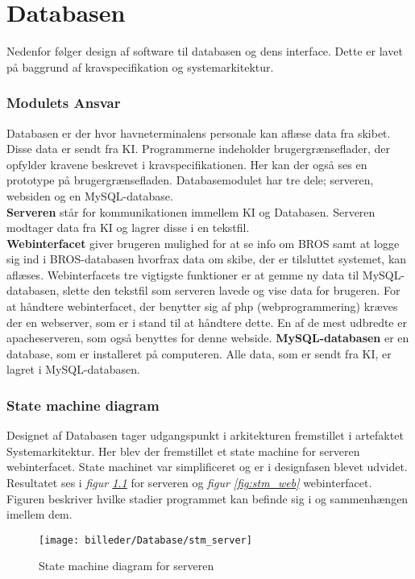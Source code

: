 \chapter{Databasen}
Nedenfor følger design af software til databasen og dens interface. Dette er lavet på baggrund af kravspecifikation og systemarkitektur. 


\subsection{Modulets Ansvar}
Databasen er der hvor havneterminalens personale kan aflæse data fra skibet. Disse data er sendt fra KI. Programmerne indeholder brugergrænseflader, der opfylder kravene beskrevet i kravspecifikationen. Her kan der også ses en prototype på brugergrænsefladen.
Databasemodulet har tre dele; serveren, websiden og en MySQL-database. \\
\textbf{Serveren} står for kommunikationen immellem KI og Databasen. Serveren modtager data fra KI og lagrer disse i en tekstfil.\\
\textbf{Webinterfacet} giver brugeren mulighed for at se info om BROS samt at logge sig ind i BROS-databasen hvorfrax data om skibe, der er tilsluttet systemet, kan aflæses. Webinterfacets tre vigtigste funktioner er at gemme ny data til MySQL-databasen, slette den tekstfil som serveren lavede og vise data for brugeren. For at håndtere webinterfacet, der benytter sig af php (webprogrammering) kræves der en webserver, som er i stand til at håndtere dette. En af de mest udbredte er apacheserveren, som også benyttes for denne webside.
\textbf{MySQL-databasen} er en database, som er  installeret på computeren. Alle data, som er sendt fra KI, er lagret i MySQL-databasen.

\subsection{State machine diagram}
Designet af Databasen tager udgangspunkt i arkitekturen fremstillet i artefaktet Systemarkitektur. Her blev der fremstillet et state machine for serveren webinterfacet. State machinet var simplificeret og er i designfasen blevet udvidet. Resultatet ses i \textit{figur \ref{fig:stm_server}} for serveren og \textit{figur \ref{fig:stm_web}} webinterfacet. Figuren beskriver hvilke stadier programmet kan befinde sig i og sammenhængen imellem dem.

\begin{figure}[H]
	\centering
	\texttt{[image: billeder/Database/stm\_server]}
	\caption{State machine diagram for serveren}
	\label{fig:stm_server}
\end{figure}

